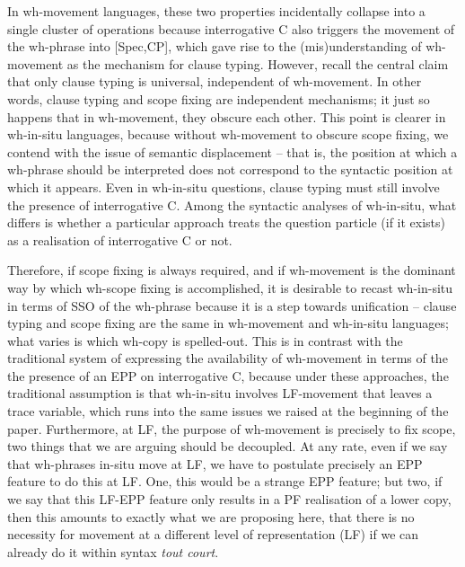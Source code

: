 \documentclass{glossa}
\begin{document}
In wh-movement languages, these two properties incidentally collapse into a single cluster of operations because interrogative C also triggers the movement of the wh-phrase into [Spec,CP], which gave rise to the (mis)understanding of wh-movement as the mechanism for clause typing. However, recall the central claim that only clause typing is universal, independent of wh-movement. In other words, clause typing and scope fixing are independent mechanisms; it just so happens that in wh-movement, they obscure each other. This point is clearer in wh-in-situ languages, because without wh-movement to obscure scope fixing, we contend with the issue of semantic displacement -- that is, the position at which a wh-phrase should be interpreted does not correspond to the syntactic position at which it appears. Even in wh-in-situ questions, clause typing must still involve the presence of interrogative C. Among the syntactic analyses of wh-in-situ, what differs is whether a particular approach treats the question particle (if it exists) as a realisation of interrogative C or not.

Therefore, if scope fixing is always required, and if wh-movement is the dominant way by which wh-scope fixing is accomplished, it is desirable to recast wh-in-situ in terms of SSO of the wh-phrase because it is a step towards unification -- clause typing and scope fixing are the same in wh-movement and wh-in-situ languages; what varies is which wh-copy is spelled-out. This is in contrast with the traditional system of expressing the availability of wh-movement in terms of the the presence of an EPP on interrogative C, because under these approaches, the traditional assumption is that wh-in-situ involves LF-movement that leaves a trace variable, which runs into the same issues we raised at the beginning of the paper. Furthermore, at LF, the purpose of wh-movement is precisely to fix scope, two things that we are arguing should be decoupled. At any rate, even if we say that wh-phrases in-situ move at LF, we have to postulate precisely an EPP feature to do this at LF. One, this would be a strange EPP feature; but two, if we say that this LF-EPP feature only results in a PF realisation of a lower copy, then this amounts to exactly what we are proposing here, that there is no necessity for movement at a different level of representation (LF) if we can already do it within syntax \textit{tout court}.

\end{document}
